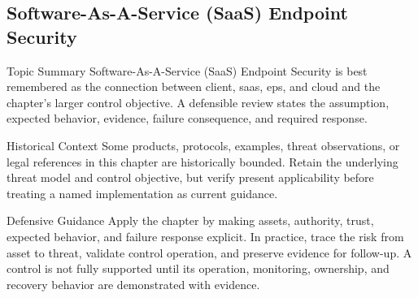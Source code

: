 \documentclass[11pt,letterpaper]{article}
\begin{document}
\subsection*{Software-As-A-Service (SaaS) Endpoint Security}
\begin{CornellNotesTable}
\end{CornellNotesTable}
\begin{CornellSummaryBox}{Topic Summary}
Software-As-A-Service (SaaS) Endpoint Security is best remembered as the connection between client, saas, eps, and cloud and the chapter's larger control objective. A defensible review states the assumption, expected behavior, evidence, failure consequence, and required response.
\end{CornellSummaryBox}
\begin{CornellWarningBox}{Historical Context}
Some products, protocols, examples, threat observations, or legal references in this chapter are historically bounded. Retain the underlying threat model and control objective, but verify present applicability before treating a named implementation as current guidance.
\end{CornellWarningBox}
\begin{CornellOverviewBox}{Defensive Guidance}
Apply the chapter by making assets, authority, trust, expected behavior, and failure response explicit. In practice, trace the risk from asset to threat, validate control operation, and preserve evidence for follow-up. A control is not fully supported until its operation, monitoring, ownership, and recovery behavior are demonstrated with evidence.
\end{CornellOverviewBox}
\end{document}
